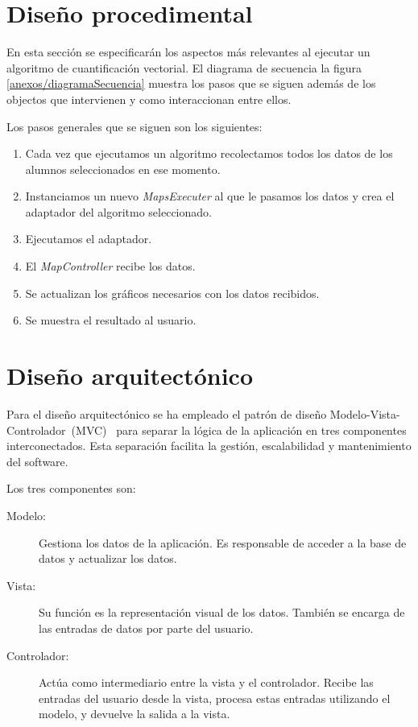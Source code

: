 \section{Diseño procedimental}

En esta sección se especificarán los aspectos más relevantes al ejecutar un algoritmo de cuantificación vectorial. El diagrama de secuencia la figura \ref{anexos/diagramaSecuencia} muestra los pasos que se siguen además de los objectos que intervienen y como interaccionan entre ellos.


Los pasos generales que se siguen son los siguientes:
\begin{enumerate}
    \item Cada vez que ejecutamos un algoritmo recolectamos todos los datos de los alumnos seleccionados en ese momento.
    \item Instanciamos un nuevo \emph{MapsExecuter} al que le pasamos los datos y crea el adaptador del algoritmo seleccionado.
    \item Ejecutamos el adaptador.
    \item El \emph{MapController} recibe los datos.
    \item Se actualizan los gráficos necesarios con los datos recibidos.
    \item Se muestra el resultado al usuario.
\end{enumerate}

\section{Diseño arquitectónico}

Para el diseño arquitectónico se ha empleado el patrón de diseño Modelo-Vista-Controlador~(MVC)~\cite{codigofacilito:mvc} para separar la lógica de la aplicación en tres componentes interconectados. Esta separación facilita la gestión, escalabilidad y mantenimiento del software.

Los tres componentes son:

\begin{description}
    \item[Modelo:] Gestiona los datos de la aplicación. Es responsable de acceder a la base de datos y actualizar los datos.
    \item[Vista:] Su función es la representación visual de los datos. También se encarga de las entradas de datos por parte del usuario.
    \item[Controlador:] Actúa como intermediario entre la vista y el controlador. Recibe las entradas del usuario desde la vista, procesa estas entradas utilizando el modelo, y devuelve la salida a la vista.
\end{description} 


